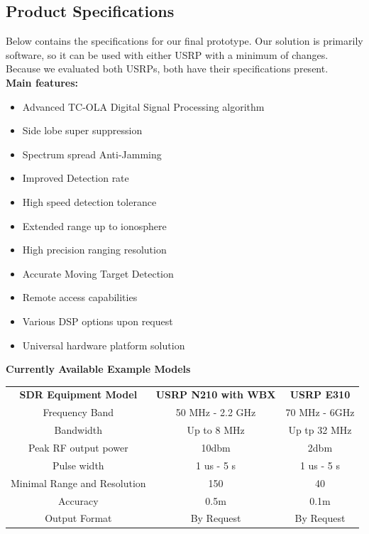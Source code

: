 \documentclass[letterpaper, 12 pt, conference]{report}
\renewcommand{\thesection}{\arabic{section}}
\numberwithin{figure}{section}
\begin{document}
\begin{appendices}
\renewcommand{\thesection}{\Alph{section}}
\section{Product Specifications}
\label{app:specs}
Below contains the specifications for our final prototype. Our solution is primarily software, so it can be used with either USRP with a minimum of changes. Because we evaluated both USRPs, both have their specifications present.\\
\fontsize{12}{12}\selectfont
\textbf{Main features:}
\begin{itemize}
  \item Advanced TC-OLA Digital Signal Processing algorithm
  \item Side lobe super suppression
  \item Spectrum spread Anti-Jamming
  \item Improved Detection rate
  \item High speed detection tolerance
  \item Extended range up to ionosphere
  \item High precision ranging resolution
  \item Accurate Moving Target Detection
  \item Remote access capabilities
  \item Various DSP options upon request
  \item Universal hardware platform solution
\end{itemize}
\textbf{Currently Available Example Models}\\
\begin{tabular}{|c|c|c|}
\hline
\textbf{SDR Equipment Model} & \textbf{USRP N210 with WBX} &  \textbf{USRP E310} \\
Frequency Band & 50 MHz - 2.2 GHz & 70 MHz - 6GHz\\
Bandwidth & Up to 8 MHz & Up tp 32 MHz\\
Peak RF output power & 10dbm & 2dbm\\
Pulse width & 1 us - 5 s & 1 us - 5 s\\
Minimal Range and Resolution & 150 & 40\\
Accuracy & 0.5m & 0.1m\\
Output Format & By Request & By Request\\
\hline
\end{tabular}



\end{appendices}
\end{document}
